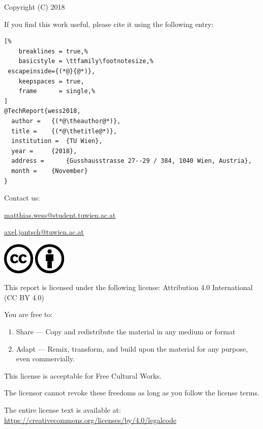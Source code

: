 Copyright (C) 2018 \theauthor

If you find this work useful, please cite it using the following \BibTeX{ } entry:

\vspace{1em}

\begin{lstlisting}[%
	breaklines = true,%
	basicstyle = \ttfamily\footnotesize,%
 escapeinside={(*@}{@*)},
	keepspaces = true,
	frame      = single,%
]
@TechReport{wess2018,
  author = 	 {(*@\theauthor@*)},
  title = 	 {(*@\thetitle@*)},
  institution =  {TU Wien},
  year = 	 {2018},
  address = 	 {Gusshausstrasse 27--29 / 384, 1040 Wien, Austria},
  month = 	 {November}
}
\end{lstlisting}

\vspace{3em}
Contact us:

\href{E-mail address}{matthias.wess@student.tuwien.ac.at}

\href{E-mail address}{axel.jantsch@tuwien.ac.at}


\vfill

\includegraphics[height=1.5cm]{fig/cc-large.png}
\includegraphics[height=1.5cm]{fig/by-large.png}


This report is licensed under the following license:
Attribution 4.0 International (CC BY 4.0)

\vspace{3em}

You are free to:

\begin{enumerate}
   \item Share --- Copy and redistribute the material in any medium or format
   \item Adapt --- Remix, transform, and build upon the material for any purpose,
			even commercially.
\end{enumerate}

This license is acceptable for Free Cultural Works.

The licensor cannot revoke these freedoms as long as you follow the license terms.

The entire license text is available at:
\href{https://creativecommons.org/licenses/by/4.0/legalcode}
	{https://creativecommons.org/licenses/by/4.0/legalcode}


